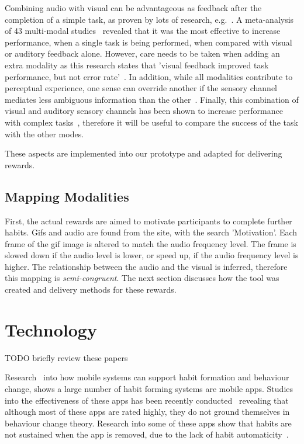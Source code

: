 \documentclass{scaffold/sigchi}
\begin{document}
Combining audio with visual can be advantageous as feedback after the completion of a simple task, as proven by lots of research, e.g.~\cite{benefits_of_audio_visual_1, benefits_of_audio_visual_2}. A meta-analysis of 43 multi-modal studies~\cite{comparing_modalities_effects_of_visual_auditory} revealed that it was the most effective to increase performance, when a single task is being performed, when compared with visual or auditory feedback alone. However, care needs to be taken when adding an extra modality as this research states that 'visual feedback improved task performance, but not error rate'~\cite{comparing_modalities_effects_of_visual_auditory}. In addition, while all modalities contribute to perceptual experience, one sense can override another if the sensory channel mediates less ambiguous information than the other~\cite{one_mode_override_another}. Finally, this combination of visual and auditory sensory channels has been shown to increase performance with complex tasks~\cite{chi_oussama_tap_the_shapetones}, therefore it will be useful to compare the success of the task with the other modes.

These aspects are implemented into our prototype and adapted for delivering rewards.

\subsection{Mapping Modalities}
First, the actual rewards are aimed to motivate participants to complete further habits. Gifs and audio are found from the site, with the search 'Motivation'. Each frame of the gif image is altered to match the audio frequency level. The frame is slowed down if the audio level is lower, or speed up, if the audio frequency level is higher. The relationship between the audio and the visual is inferred, therefore this mapping is \textit{semi-congruent}. The next section discusses how the tool was created and delivery methods for these rewards.

\section{Technology}
TODO briefly review these papers\cite{chi_mechanics_of_persuasive_system_design, chi_time_aware_leveraging_framing_effects, personal_tracking_of_screen_time, chi_crowd_designed_motivation}

Research~\cite{survey_on_apps_2,survey_on_current_apps_of_steel} into how mobile systems can support habit formation and behaviour change, shows a large number of habit forming systems are mobile apps. Studies into the effectiveness of these apps has been recently conducted~\cite{article_beyond_self_tracking_designing_apps, article_dont_kick_habit} revealing that although most of these apps are rated highly, they do not ground themselves in behaviour change theory. Research into some of these apps show that habits are not sustained when the app is removed, due to the lack of habit automaticity~\cite{article_beyond_self_tracking_designing_apps}.
\end{document}
